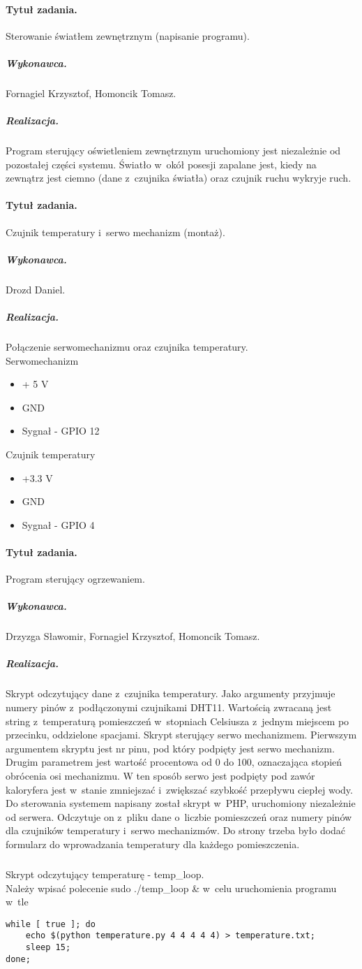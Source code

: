\paragraph{Tytuł zadania.} Sterowanie światłem zewnętrznym (napisanie programu).
\subparagraph{Wykonawca.} Fornagiel Krzysztof, Homoncik Tomasz.
\subparagraph{Realizacja.} Program sterujący oświetleniem zewnętrznym uruchomiony jest niezależnie od pozostałej części systemu. Światło w~okół posesji zapalane jest, kiedy na zewnątrz jest ciemno (dane z~czujnika światła) oraz czujnik ruchu wykryje ruch.

\paragraph{Tytuł zadania.} Czujnik temperatury i~serwo mechanizm (montaż).
\subparagraph{Wykonawca.} Drozd Daniel.
\subparagraph{Realizacja.} Połączenie serwomechanizmu oraz czujnika temperatury.\\
Serwomechanizm
\begin{itemize}
	\item + 5 V
	\item GND
	\item Sygnał - GPIO 12
\end{itemize}
Czujnik temperatury
\begin{itemize}
	\item +3.3 V
	\item GND
	\item Sygnał - GPIO 4
\end{itemize}


\paragraph{Tytuł zadania.} Program sterujący ogrzewaniem.
\subparagraph{Wykonawca.} Drzyzga Sławomir, Fornagiel Krzysztof, Homoncik Tomasz.
\subparagraph{Realizacja.} Skrypt odczytujący dane z~czujnika temperatury. Jako argumenty przyjmuje numery pinów z~podłączonymi czujnikami DHT11. Wartością zwracaną jest string z~temperaturą pomieszczeń w~stopniach Celsiusza z~jednym miejscem po przecinku, oddzielone spacjami. 
\break
Skrypt sterujący serwo mechanizmem. Pierwszym argumentem skryptu jest nr pinu, pod który podpięty jest serwo mechanizm. Drugim parametrem jest wartość procentowa od 0 do 100, oznaczająca stopień obrócenia osi mechanizmu. W ten sposób serwo jest podpięty pod zawór kaloryfera jest w~stanie zmniejszać i~zwiększać szybkość przepływu ciepłej wody.
\break
Do sterowania systemem napisany został skrypt w~PHP, uruchomiony niezależnie od serwera. Odczytuje on z~pliku dane o~liczbie pomieszczeń oraz numery pinów dla czujników temperatury i~serwo mechanizmów.
Do strony trzeba było dodać formularz do wprowadzania temperatury dla każdego pomieszczenia.
\subparagraph{}
Skrypt odczytujący temperaturę - temp\_loop. \\
Należy wpisać polecenie sudo ./temp\_loop \& w~celu uruchomienia programu w~tle
\begin{verbatim}
while [ true ]; do 
	echo $(python temperature.py 4 4 4 4 4) > temperature.txt; 
	sleep 15; 
done;
\end{verbatim}



